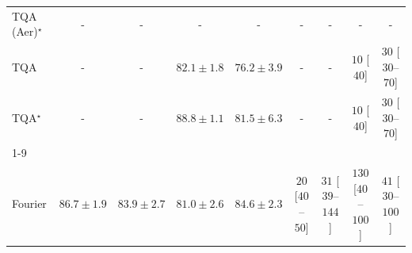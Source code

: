 \begin{tabular}{l|cccc|cccc|}
TQA (Aer)$^\star$ & {\cellcolor[HTML]{000000}} \color[HTML]{F1F1F1} {\cellcolor{white}} \color{black} - & {\cellcolor[HTML]{000000}} \color[HTML]{F1F1F1} {\cellcolor{white}} \color{black} - & {\cellcolor[HTML]{000000}} \color[HTML]{F1F1F1} {\cellcolor{white}} \color{black} - & {\cellcolor[HTML]{000000}} \color[HTML]{F1F1F1} {\cellcolor{white}} \color{black} - & {\cellcolor[HTML]{000000}} \color[HTML]{F1F1F1} {\cellcolor{white}} \color{black} - & {\cellcolor[HTML]{000000}} \color[HTML]{F1F1F1} {\cellcolor{white}} \color{black} - & {\cellcolor[HTML]{000000}} \color[HTML]{F1F1F1} {\cellcolor{white}} \color{black} - & {\cellcolor[HTML]{000000}} \color[HTML]{F1F1F1} {\cellcolor{white}} \color{black} - \\
TQA & {\cellcolor[HTML]{000000}} \color[HTML]{F1F1F1} {\cellcolor{white}} \color{black} - & {\cellcolor[HTML]{000000}} \color[HTML]{F1F1F1} {\cellcolor{white}} \color{black} - & {\cellcolor[HTML]{F07919}} \color[HTML]{F1F1F1} $82.1\pm 1.8$ & {\cellcolor[HTML]{FECB5F}} \color[HTML]{000000} $76.2\pm 3.9$ & {\cellcolor[HTML]{000000}} \color[HTML]{F1F1F1} {\cellcolor{white}} \color{black} - & {\cellcolor[HTML]{000000}} \color[HTML]{F1F1F1} {\cellcolor{white}} \color{black} - & {\cellcolor[HTML]{FFF7F3}} \color[HTML]{000000} $10$ [$40$] & {\cellcolor[HTML]{FFF3EF}} \color[HTML]{000000} $30$ [$30$--$70$] \\
TQA$^\star$ & {\cellcolor[HTML]{000000}} \color[HTML]{F1F1F1} {\cellcolor{white}} \color{black} - & {\cellcolor[HTML]{000000}} \color[HTML]{F1F1F1} {\cellcolor{white}} \color{black} - & {\cellcolor[HTML]{963304}} \color[HTML]{F1F1F1} $88.8\pm 1.1$ & {\cellcolor[HTML]{F4811D}} \color[HTML]{F1F1F1} $81.5\pm 6.3$ & {\cellcolor[HTML]{000000}} \color[HTML]{F1F1F1} {\cellcolor{white}} \color{black} - & {\cellcolor[HTML]{000000}} \color[HTML]{F1F1F1} {\cellcolor{white}} \color{black} - & {\cellcolor[HTML]{FFF7F3}} \color[HTML]{000000} $10$ [$40$] & {\cellcolor[HTML]{FFF3EF}} \color[HTML]{000000} $30$ [$30$--$70$] \\
\cline{1-9}
\multicolumn{9}{c}{\rule{0pt}{8pt}PP} \\
\midrule
Fourier & {\cellcolor[HTML]{177B3F}} \color[HTML]{F1F1F1} $86.7\pm 1.9$ & {\cellcolor[HTML]{359C53}} \color[HTML]{F1F1F1} $83.9\pm 2.7$ & {\cellcolor[HTML]{61BB6D}} \color[HTML]{F1F1F1} $81.0\pm 2.6$ & {\cellcolor[HTML]{2E924C}} \color[HTML]{F1F1F1} $84.6\pm 2.3$ & {\cellcolor[HTML]{FFF5F1}} \color[HTML]{000000} $20$ [$40$--$50$] & {\cellcolor[HTML]{FFF3EF}} \color[HTML]{000000} $31$ [$39$--$144$] & {\cellcolor[HTML]{FDDBD7}} \color[HTML]{000000} $130$ [$40$--$100$] & {\cellcolor[HTML]{FEF0EC}} \color[HTML]{000000} $41$ [$30$--$100$] \\

\end{tabular}
